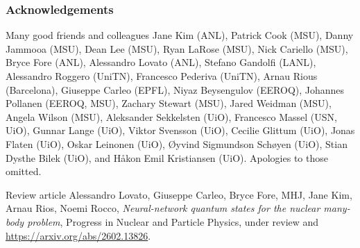 \documentclass[aspectratio=169,10pt]{beamer}
\begin{document}
\begin{frame}
\frametitle{Acknowledgements}

\begin{alertblock}{Many good friends and colleagues}
Jane Kim (ANL), Patrick Cook (MSU), Danny Jammooa (MSU), Dean Lee (MSU), Ryan LaRose (MSU), Nick Cariello (MSU), Bryce Fore (ANL), Alessandro Lovato (ANL), Stefano Gandolfi (LANL), Alessandro Roggero (UniTN),  Francesco Pederiva (UniTN), Arnau Rious (Barcelona), Giuseppe Carleo (EPFL), 
Niyaz Beysengulov (EEROQ), Johannes Pollanen (EEROQ, MSU), Zachary Stewart (MSU), Jared Weidman (MSU), Angela Wilson (MSU), Aleksander Sekkelsten (UiO), Francesco Massel (USN, UiO), Gunnar Lange (UiO), Viktor Svensson (UiO), Cecilie Glittum (UiO),
Jonas Flaten (UiO), Oskar Leinonen (UiO), Øyvind Sigmundson Schøyen (UiO), Stian Dysthe Bilek (UiO), and Håkon Emil Kristiansen (UiO). Apologies to those omitted.
\end{alertblock}

\begin{alertblock}{Review article}
Alessandro Lovato, Giuseppe Carleo, Bryce Fore, MHJ, Jane Kim, Arnau Rios, Noemi Rocco, {\em Neural-network quantum states for the nuclear many-body problem}, Progress in Nuclear and Particle Physics, under review and \url{https://arxiv.org/abs/2602.13826}.
\end{alertblock}

\end{frame}
\end{document}
